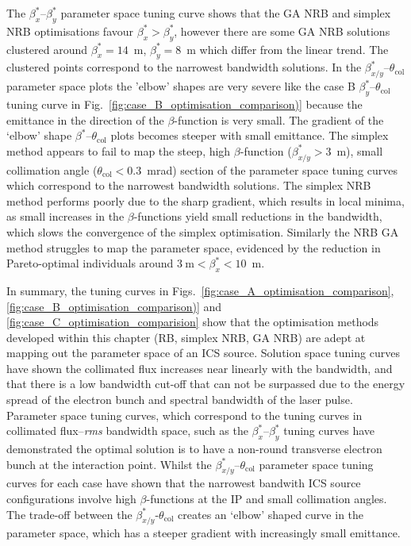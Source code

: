 \documentclass[../main.tex]{subfiles}
\begin{document}
The $\beta_{x}^{*}$--$\beta_{y}^{*}$ parameter space tuning curve shows that the GA NRB and simplex NRB optimisations favour $\beta_{x}^{*} > \beta_{y}^{*}$, however there are some GA NRB solutions clustered around $\beta_{x}^{*} = 14$~\si{\meter}, $\beta_{y}^{*} = 8$~\si{\meter} which differ from the linear trend. The clustered points correspond to the narrowest bandwidth solutions. In the $\beta_{x/y}^{*}$--$\theta_{\mathrm{col}}$ parameter space plots the 'elbow' shapes are very severe like the  case B $\beta_{y}^{*}$--$\theta_{\mathrm{col}}$ tuning curve in Fig.~\ref{fig:case_B_optimisation_comparison)} because the emittance in the direction of the $\beta$-function is very small. The gradient of the `elbow' shape $\beta^{*}$--$\theta_{\mathrm{col}}$ plots becomes steeper with small emittance. The simplex method appears to fail to map the steep, high $\beta$-function ($\beta_{x/y}^{*} > 3$~\si{\meter}), small collimation angle ($\theta_{\mathrm{col}} < 0.3$~\si{\milli\radian}) section of the parameter space tuning curves which correspond to the narrowest bandwidth solutions. The simplex NRB method performs poorly due to the sharp gradient, which results in local minima, as small increases in the $\beta$-functions yield small reductions in the bandwidth, which slows the convergence of the simplex optimisation. Similarly the NRB GA method struggles to map the parameter space, evidenced by the reduction in Pareto-optimal individuals around $3~\si{\meter} < \beta_{x}^{*} < 10$~\si{\meter}. 

In summary, the tuning curves in Figs.~\ref{fig:case_A_optimisation_comparison}, \ref{fig:case_B_optimisation_comparison)} and \ref{fig:case_C_optimisation_comparision} show that the optimisation methods developed within this chapter (RB, simplex NRB, GA NRB) are adept at mapping out the parameter space of an ICS source. Solution space tuning curves have shown the collimated flux increases near linearly with the  bandwidth, and that there is a low bandwidth cut-off that can not be surpassed due to the energy spread of the electron bunch and spectral bandwidth of the laser pulse. Parameter space tuning curves, which correspond to the tuning curves in collimated flux--\textit{rms} bandwidth space, such as the $\beta_{x}^{*}$--$\beta_{y}^{*}$ tuning curves have demonstrated the optimal solution is to have a non-round transverse electron bunch at the interaction point. Whilst the $\beta_{x/y}^{*}$--$\theta_{\mathrm{col}}$ parameter space tuning curves for each case have shown that the narrowest bandwith ICS source configurations involve high $\beta$-functions at the IP and small collimation angles. The trade-off between the $\beta_{x/y}^{*}$-$\theta_{\mathrm{col}}$ creates an `elbow' shaped curve in the parameter space, which has a steeper gradient with increasingly small emittance.      
\end{document}
